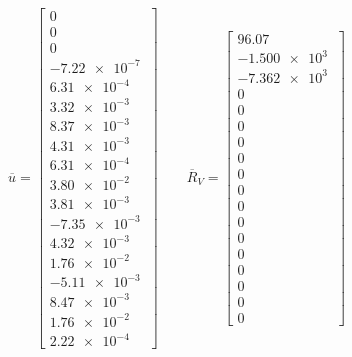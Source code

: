\[
\overline{u} = \left[
    \begin{array}{c}
    0\\0\\0\\\SI{-7.22e-7}{}\\\SI{6.31e-4}{}\\\SI{3.32e-3}{}\\\SI{8.37e-3}{}\\\SI{4.31e-3}{}\\\SI{6.31e-4}{}\\\SI{3.80e-2}{}\\\SI{3.81e-3}{}\\\SI{-7.35e-3}{}\\\SI{4.32e-3}{}\\\SI{1.76e-2}{}\\\SI{-5.11e-3}{}\\\SI{8.47e-3}{}\\\SI{1.76e-2}{}\\\SI{2.22e-4}{}
    \end{array}
    \right]
\qquad    
\overline{R}_V = \left[
    \begin{array}{c}
    96.07\\\SI{-1.500e3}{}\\\SI{-7.362e3}{}\\0\\0\\0\\0\\0\\0\\0\\0\\0\\0\\0\\0\\0\\0\\0 
    \end{array}
    \right]
\]
